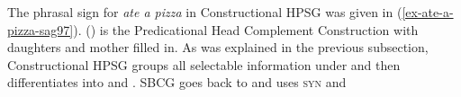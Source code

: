 \documentclass[output=paper
	        ,collection
	        ,collectionchapter
 	        ,biblatex
                ,babelshorthands
                ,newtxmath
                ,draftmode
                ,colorlinks, citecolor=brown
]{langscibook}
\begin{document}

The phrasal sign for \emph{ate a pizza} in Constructional HPSG was given in
(\ref{ex-ate-a-pizza-sag97}). () is the Predicational Head Complement Construction with
daughters and mother filled in.
\ea
\label{feat-geom-sag2012}
\z
As was explained in the previous subsection, Constructional HPSG groups all selectable information under
\synsem and then differentiates into \cat and \cont. SBCG goes back to \citet{ps} and uses \textsc{syn} and
\end{document}
